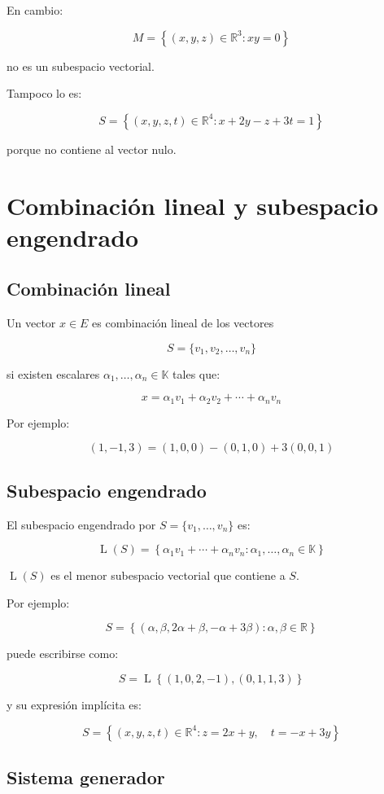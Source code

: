 \documentclass[11pt,a4paper]{article}
\newcommand{\R}{\mathbb{R}}
\newcommand{\K}{\mathbb{K}}
\newcommand{\Span}{\operatorname{L}}
\begin{document}
En cambio:

\[
M=
\left\{
(x,y,z)\in\R^3:
xy=0
\right\}
\]

no es un subespacio vectorial.

Tampoco lo es:

\[
S=
\left\{
(x,y,z,t)\in\R^4:
x+2y-z+3t=1
\right\}
\]

porque no contiene al vector nulo.

\section{Combinación lineal y subespacio engendrado}

\subsection{Combinación lineal}

Un vector $x\in E$ es combinación lineal de los vectores

\[
S=\{v_1,v_2,\ldots,v_n\}
\]

si existen escalares $\alpha_1,\ldots,\alpha_n\in\K$ tales que:

\[
x=
\alpha_1v_1+\alpha_2v_2+\cdots+\alpha_nv_n
\]

Por ejemplo:

\[
(1,-1,3)
=
(1,0,0)-(0,1,0)+3(0,0,1)
\]

\subsection{Subespacio engendrado}

El subespacio engendrado por $S=\{v_1,\ldots,v_n\}$ es:

\[
\Span(S)
=
\left\{
\alpha_1v_1+\cdots+\alpha_nv_n:
\alpha_1,\ldots,\alpha_n\in\K
\right\}
\]

$\Span(S)$ es el menor subespacio vectorial que contiene a $S$.

Por ejemplo:

\[
S=
\left\{
(\alpha,\beta,2\alpha+\beta,-\alpha+3\beta):
\alpha,\beta\in\R
\right\}
\]

puede escribirse como:

\[
S=
\Span\left\{
(1,0,2,-1),
(0,1,1,3)
\right\}
\]

y su expresión implícita es:

\[
S=
\left\{
(x,y,z,t)\in\R^4:
z=2x+y,\quad
t=-x+3y
\right\}
\]

\subsection{Sistema generador}
\end{document}
